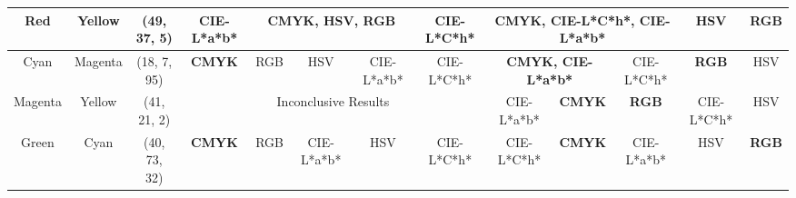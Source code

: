 \begin{table}[htbp]
{\begin{tabular}{@{}ccclcccccccccc@{}}
    Red                     & \multicolumn{1}{c|}{Yellow}                    & \multicolumn{2}{c|}{\cellcolor[HTML]{FF8000}(49, 37, 5)}   & \multicolumn{1}{c|}{CIE-L*a*b*}                            & \multicolumn{3}{c|}{\textbf{CMYK, HSV, RGB}}                                                           & \multicolumn{1}{c|}{CIE-L*C*h*} & \multicolumn{3}{c|}{\textbf{CMYK, CIE-L*C*h*, CIE-L*a*b*}}                                                                                                      & \multicolumn{1}{c|}{HSV}                          & \multicolumn{1}{c|}{\textbf{RGB}}                 \\ \midrule
    Cyan                    & \multicolumn{1}{c|}{Magenta}                   & \multicolumn{2}{c|}{\cellcolor[HTML]{0000FF}(18, 7, 95)}   & \multicolumn{1}{c|}{\textbf{CMYK}}                                  & \multicolumn{1}{c|}{RGB}           & \multicolumn{1}{c|}{HSV}        & \multicolumn{1}{c|}{CIE-L*a*b*} & \multicolumn{1}{c|}{CIE-L*C*h*} & \multicolumn{2}{c|}{\textbf{CMYK, CIE-L*a*b*}}                                                              & \multicolumn{1}{c|}{CIE-L*C*h*}                   & \multicolumn{1}{c|}{\textbf{RGB}}                 & \multicolumn{1}{c|}{HSV}                          \\ \midrule
    Magenta                 & \multicolumn{1}{c|}{Yellow}                    & \multicolumn{2}{c|}{\cellcolor[HTML]{FF0000}(41, 21, 2)}   & \multicolumn{5}{c|}{Inconclusive Results}                                                                                                                                                             & \multicolumn{1}{c|}{CIE-L*a*b*}                      & \multicolumn{1}{c|}{\textbf{CMYK}}                   & \multicolumn{1}{c|}{\textbf{RGB}}                 & \multicolumn{1}{c|}{CIE-L*C*h*}                   & \multicolumn{1}{c|}{HSV}                          \\ \midrule
    Green                   & \multicolumn{1}{c|}{Cyan}                      & \multicolumn{2}{c|}{\cellcolor[HTML]{00FF80}(40, 73, 32)}  & \multicolumn{1}{c|}{\textbf{CMYK}}                         & \multicolumn{1}{c|}{RGB}           & \multicolumn{1}{c|}{CIE-L*a*b*} & \multicolumn{1}{c|}{HSV}        & \multicolumn{1}{c|}{CIE-L*C*h*} & \multicolumn{1}{c|}{CIE-L*C*h*}                      & \multicolumn{1}{c|}{\textbf{CMYK}}                   & \multicolumn{1}{c|}{CIE-L*a*b*}                   & \multicolumn{1}{c|}{HSV}                          & \multicolumn{1}{c|}{\textbf{RGB}}                 \\ \midrule

\end{tabular}}
\end{table}
